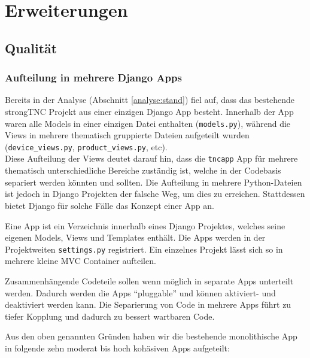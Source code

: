 \section{Erweiterungen}

\subsection{Qualität}

\subsubsection{Aufteilung in mehrere Django Apps}

Bereits in der Analyse (Abschnitt \ref{analyse:stand}) fiel auf, dass
das bestehende strongTNC Projekt aus einer einzigen Django App besteht. 
Innerhalb der App waren alle Models in einer
einzigen Datei enthalten (\texttt{models.py}), während die Views in mehrere
thematisch gruppierte Dateien aufgeteilt wurden (\texttt{device\_views.py},
\texttt{product\_views.py}, etc).\\
Diese Aufteilung der Views deutet darauf hin, dass die \texttt{tncapp} App für
mehrere thematisch unterschiedliche Bereiche zuständig ist, welche in der
Codebasis separiert werden könnten und sollten. Die Aufteilung in mehrere
Python-Dateien ist jedoch in Django Projekten der falsche Weg, um dies zu
erreichen. Stattdessen bietet Django für solche Fälle das Konzept einer App an.

Eine App ist ein Verzeichnis innerhalb eines Django Projektes, welches seine eigenen
Models, Views und Templates enthält. Die Apps werden in der
Projektweiten \texttt{settings.py} registriert. Ein einzelnes Projekt lässt sich
so in mehrere kleine MVC Container aufteilen.

Zusammenhängende Codeteile sollen wenn möglich in separate Apps unterteilt werden.
Dadurch werden die Apps \enquote{pluggable} und können aktiviert- und
deaktiviert werden kann. Die Separierung von Code in mehrere Apps
führt zu tiefer Kopplung\cite[S.~232--237]{larman2002applying}
und dadurch zu bessert wartbaren Code.

Aus den oben genannten Gründen haben wir die bestehende monolithische App in
folgende zehn moderat bis hoch kohäsiven Apps aufgeteilt:

